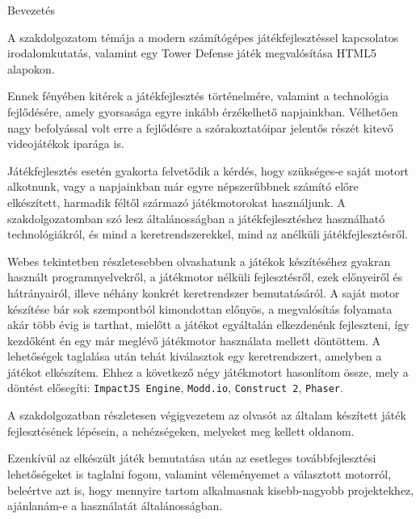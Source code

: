 \begin{MyChapter}{Bevezetés}
	
	A szakdolgozatom témája a modern számítógépes játékfejlesztéssel kapcsolatos irodalomkutatás, valamint egy Tower Defense játék megvalósítása HTML5 alapokon.
	
	Ennek fényében kitérek a játékfejlesztés történelmére, valamint a technológia fejlődésére, amely gyorsasága egyre inkább érzékelhető napjainkban. Vélhetően nagy befolyással volt erre a fejlődésre a szórakoztatóipar jelentős részét kitevő videojátékok iparága is. 
	
	Játékfejlesztés esetén gyakorta felvetődik a kérdés, hogy szükséges-e saját motort alkotnunk, vagy a napjainkban már egyre népszerűbbnek számító előre elkészített, harmadik féltől származó játékmotorokat használjunk. A szakdolgozatomban szó lesz általánosságban a játékfejlesztéshez használható technológiákról, és mind a keretrendszerekkel, mind az anélküli játékfejlesztésről.
	
	Webes tekintetben részletesebben olvashatunk a játékok készítéséhez gyakran használt programnyelvekről, a játékmotor nélküli fejlesztésről, ezek előnyeiről és hátrányairól, illeve néhány konkrét keretrendszer bemutatásáról. A saját motor készítése bár sok szempontból kimondottan előnyös, a megvalósítás folyamata akár több évig is tarthat, mielőtt a játékot egyáltalán elkezdenénk fejleszteni, így kezdőként én egy már meglévő játékmotor használata mellett döntöttem. A lehetőségek taglalása után tehát kiválasztok egy keretrendszert, amelyben a játékot elkészítem. Ehhez a következő négy játékmotort hasonlítom össze, mely a döntést elősegíti: \texttt{ImpactJS Engine}, \texttt{Modd.io}, \texttt{Construct 2}, \texttt{Phaser}.
	
	A szakdolgozatban részletesen végigvezetem az olvasót az általam készített játék fejlesztésének lépésein, a nehézségeken, melyeket meg kellett oldanom.

	Ezenkívül az elkészült játék bemutatása után az esetleges továbbfejlesztési lehetőségeket is taglalni fogom, valamint véleményemet a választott motorról, beleértve azt is, hogy mennyire tartom alkalmasnak kisebb-nagyobb projektekhez, ajánlanám-e a használatát általánosságban.
	
\end{MyChapter}